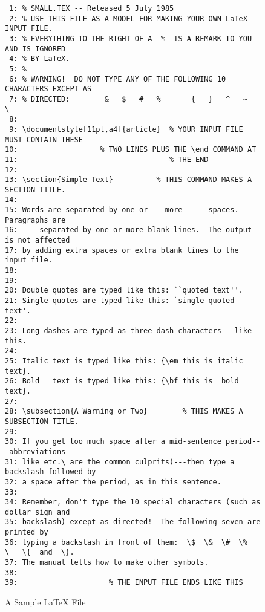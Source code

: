\begin{figure} %
{\footnotesize\begin{verbatim}
 1: % SMALL.TEX -- Released 5 July 1985
 2: % USE THIS FILE AS A MODEL FOR MAKING YOUR OWN LaTeX INPUT FILE.
 3: % EVERYTHING TO THE RIGHT OF A  %  IS A REMARK TO YOU AND IS IGNORED
 4: % BY LaTeX.
 5: %
 6: % WARNING!  DO NOT TYPE ANY OF THE FOLLOWING 10 CHARACTERS EXCEPT AS
 7: % DIRECTED:        &   $   #   %   _   {   }   ^   ~   \
 8:
 9: \documentstyle[11pt,a4]{article}  % YOUR INPUT FILE MUST CONTAIN THESE
10:                   % TWO LINES PLUS THE \end COMMAND AT
11:                                   % THE END
12:
13: \section{Simple Text}          % THIS COMMAND MAKES A SECTION TITLE.
14:
15: Words are separated by one or    more      spaces.  Paragraphs are
16:     separated by one or more blank lines.  The output is not affected
17: by adding extra spaces or extra blank lines to the input file.
18:
19:
20: Double quotes are typed like this: ``quoted text''.
21: Single quotes are typed like this: `single-quoted text'.
22:
23: Long dashes are typed as three dash characters---like this.
24:
25: Italic text is typed like this: {\em this is italic text}.
26: Bold   text is typed like this: {\bf this is  bold  text}.
27:
28: \subsection{A Warning or Two}        % THIS MAKES A SUBSECTION TITLE.
29:
30: If you get too much space after a mid-sentence period---abbreviations
31: like etc.\ are the common culprits)---then type a backslash followed by
32: a space after the period, as in this sentence.
33:
34: Remember, don't type the 10 special characters (such as dollar sign and
35: backslash) except as directed!  The following seven are printed by
36: typing a backslash in front of them:  \$  \&  \#  \%  \_  \{  and  \}.
37: The manual tells how to make other symbols.
38:
39:                     % THE INPUT FILE ENDS LIKE THIS
\end{verbatim}  }

\caption{A Sample \LaTeX{} File}\label{fig:sample}

\end{figure} %

